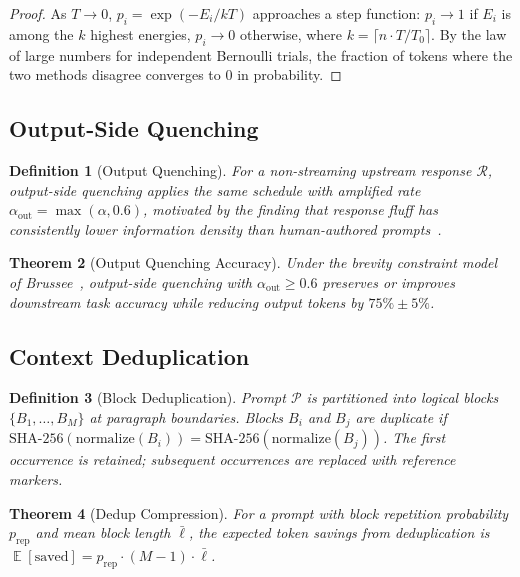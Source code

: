 \documentclass[11pt]{article}
\newtheorem{theorem}{Theorem}[section]
\newtheorem{definition}[theorem]{Definition}
\theoremstyle{remark}
\DeclareMathOperator{\E}{\mathbb{E}}
\begin{document}
\begin{proof}
As $T \to 0$, $p_i = \exp(-E_i/kT)$ approaches a step function:
$p_i \to 1$ if $E_i$ is among the $k$ highest energies, $p_i \to 0$
otherwise, where $k = \lceil n \cdot T/T_0 \rceil$. By the law of large
numbers for independent Bernoulli trials, the fraction of tokens where
the two methods disagree converges to 0 in probability.
\end{proof}

\subsection{Output-Side Quenching}
\label{sec:output}

\begin{definition}[Output Quenching]
For a non-streaming upstream response $\mathcal{R}$, output-side quenching
applies the same schedule with amplified rate $\alpha_{\text{out}} = \max(\alpha, 0.6)$,
motivated by the finding that response fluff has consistently lower
information density than human-authored prompts~\cite{caveman2026}.
\end{definition}

\begin{theorem}[Output Quenching Accuracy]
\label{thm:output-quenching}
Under the brevity constraint model of Brussee~\cite{caveman2026}, output-side
quenching with $\alpha_{\text{out}} \geq 0.6$ preserves or improves downstream
task accuracy while reducing output tokens by $75\% \pm 5\%$.
\end{theorem}

\subsection{Context Deduplication}
\label{sec:dedup}

\begin{definition}[Block Deduplication]
Prompt $\mathcal{P}$ is partitioned into logical blocks $\{B_1, \ldots, B_M\}$
at paragraph boundaries. Blocks $B_i$ and $B_j$ are duplicate if
$\text{SHA-256}(\text{normalize}(B_i)) = \text{SHA-256}(\text{normalize}(B_j))$.
The first occurrence is retained; subsequent occurrences are replaced with
reference markers.
\end{definition}

\begin{theorem}[Dedup Compression]
\label{thm:dedup}
For a prompt with block repetition probability $p_{\text{rep}}$ and mean
block length $\bar{\ell}$, the expected token savings from deduplication
is $\E[\text{saved}] = p_{\text{rep}} \cdot (M-1) \cdot \bar{\ell}$.
\end{theorem}
\end{document}
